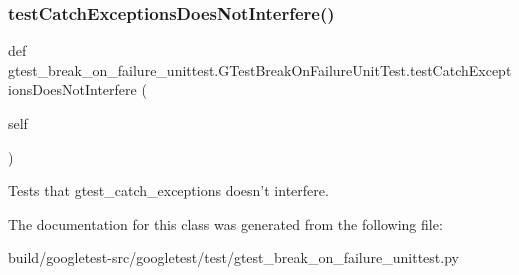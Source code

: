 \subsubsection{\texorpdfstring{test\+Catch\+Exceptions\+Does\+Not\+Interfere()}{testCatchExceptionsDoesNotInterfere()}}
{\footnotesize\ttfamily def gtest\+\_\+break\+\_\+on\+\_\+failure\+\_\+unittest.\+G\+Test\+Break\+On\+Failure\+Unit\+Test.\+test\+Catch\+Exceptions\+Does\+Not\+Interfere (\begin{DoxyParamCaption}\item[{}]{self }\end{DoxyParamCaption})}

\begin{DoxyVerb}Tests that gtest_catch_exceptions doesn't interfere.\end{DoxyVerb}
 

The documentation for this class was generated from the following file\+:\begin{DoxyCompactItemize}
\item 
build/googletest-\/src/googletest/test/gtest\+\_\+break\+\_\+on\+\_\+failure\+\_\+unittest.\+py\end{DoxyCompactItemize}
